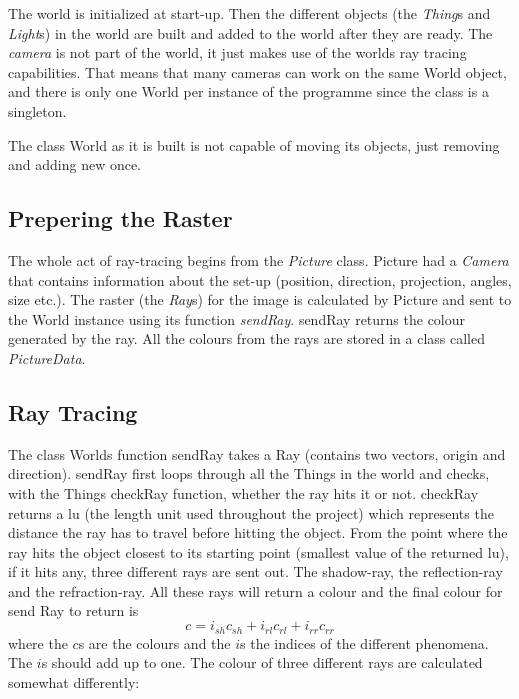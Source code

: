 		The world is initialized at start-up. Then the different objects (the \emph{Thing}s and \emph{Light}s) in the world are built and added to the world after they are ready. The \emph{camera} is not part of the world, it just makes use of the worlds ray tracing capabilities. That means that many cameras can work on the same World object, and there is only one World per instance of the programme since the class is a singleton.

		The class World as it is built is not capable of moving its objects, just removing and adding new once. 
	
	\subsection{Prepering the Raster}
	
		The whole act of ray-tracing begins from the \emph{Picture} class. Picture had a \emph{Camera} that contains information about the set-up (position, direction, projection, angles, size etc.). The raster (the \emph{Ray}s) for the image is calculated by Picture and sent to the World instance using its function \emph{sendRay}. sendRay returns the colour generated by the ray. All the colours from the rays are stored in a class called \emph{PictureData}.
	
	\subsection{Ray Tracing} 
	
		The class Worlds function sendRay takes a Ray (contains two vectors, origin and direction). sendRay first loops through all the Things in the world and checks, with the Things checkRay function, whether the ray hits it or not. checkRay returns a lu (the length unit used throughout the project) which represents the distance the ray has to travel before hitting the object. From the point where the ray hits the object closest to its starting point (smallest value of the returned lu), if it hits any, three different rays are sent out. The shadow-ray, the reflection-ray and the refraction-ray. All these rays will return a colour and the final colour for send Ray to return is
		\begin{equation}
			c = i_{sh} c_{sh} + i_{rl} c_{rl} + i_{rr}c_{rr}
		\end{equation}
		where the $c$s are the colours and the $i$s the indices of the different phenomena. The $i$s should add up to one. The colour of three different rays are calculated somewhat differently:

